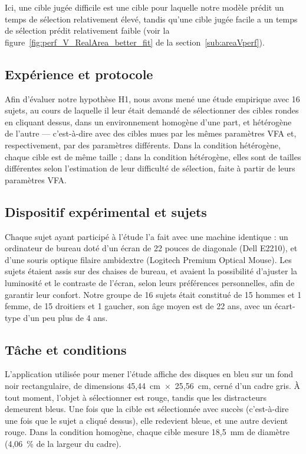 	Ici, une cible \og jugée difficile \fg{} est une cible pour laquelle notre modèle prédit un temps de sélection relativement élevé, tandis qu'une cible \og jugée facile \fg{} a un temps de sélection prédit relativement faible (voir la figure~\ref{fig:perf_V_RealArea_better_fit} de la section~\ref{sub:areaVperf}).
	
	\subsection{Expérience et protocole}
	\label{sub:as_protocol}
	Afin d'évaluer notre hypothèse H1, nous avons mené une étude empirique avec 16 sujets, au cours de laquelle il leur était demandé de sélectionner des cibles rondes en cliquant dessus, dans un environnement homogène d'une part, et hétérogène de l'autre --- c'est-à-dire avec des cibles mues par les mêmes paramètres VFA et, respectivement, par des paramètres différents. Dans la condition hétérogène, chaque cible est de même taille ; dans la condition hétérogène, elles sont de tailles différentes selon l'estimation de leur difficulté de sélection, faite à partir de leurs paramètres VFA.
	
	\subsection{Dispositif expérimental et sujets}
	Chaque sujet ayant participé à l'étude l'a fait avec une machine identique : un ordinateur de bureau doté d'un écran de 22 pouces de diagonale (Dell E2210), et d'une souris optique filaire ambidextre (Logitech Premium Optical Mouse). Les sujets étaient assis sur des chaises de bureau, et avaient la possibilité d'ajuster la luminosité et le contraste de l'écran, selon leurs préférences personnelles, afin de garantir leur confort. Notre groupe de 16 sujets était constitué de 15 hommes et 1 femme, de 15 droitiers et 1 gaucher, son âge moyen est de 22 ans, avec un écart-type d'un peu plus de 4 ans.
	
	\subsection{Tâche et conditions}
	L'application utilisée pour mener l'étude affiche des disques en bleu sur un fond noir rectangulaire, de dimensions 45,44~cm~$\times$~25,56~cm, cerné d'un cadre gris. À tout moment, l'objet à sélectionner est rouge, tandis que les distracteurs demeurent bleus. Une fois que la cible est sélectionnée avec succès (c'est-à-dire une fois que le sujet a cliqué dessus), elle redevient bleue, et une autre devient rouge. Dans la condition homogène, chaque cible mesure 18,5~mm de diamètre (4,06~\%{} de la largeur du cadre).
	
